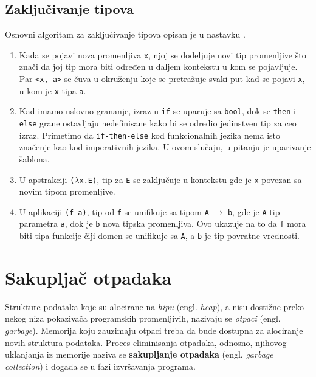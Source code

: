 \documentclass[a4paper]{article}
\begin{document}
\subsection{Zaključivanje tipova}
\label{subsec: zakljucivanje tipova}

Osnovni algoritam za zaključivanje tipova opisan je u nastavku \cite{basic-typechecking}.

\begin{enumerate}
	\item Kada se pojavi nova promenljiva \verb|x|, njoj se dodeljuje novi tip promenljive što znači da joj tip mora biti određen u daljem kontekstu u kom se pojavljuje. Par \verb|<x, a>| se čuva u okruženju koje se pretražuje svaki put kad se pojavi \verb|x|, u kom je \verb|x| tipa \verb|a|.
	
	\item Kad imamo uslovno grananje, izraz u \verb|if| se uparuje sa \verb|bool|, dok se \verb|then| i \verb|else| grane ostavljaju nedefinisane kako bi se odredio jedinstven tip za ceo izraz. Primetimo da \verb|if-then-else| kod funkcionalnih jezika nema isto značenje kao kod imperativnih jezika. U ovom slučaju, u pitanju je uparivanje šablona.
	
	\item U apstrakciji \verb|(|$\lambda$\verb|x.E)|, tip za \verb|E| se zaključuje u kontekstu gde je \verb|x| povezan sa novim tipom promenljive.
	
	\item U aplikaciji \verb|(f a)|, tip od \verb|f| se unifikuje sa tipom \verb|A| $\longrightarrow$ \verb|b|, gde je \verb|A| tip parametra \verb|a|, dok je \verb|b| nova tipska promenljiva. Ovo ukazuje na to da \verb|f| mora biti tipa funkcije čiji domen se unifikuje sa \verb|A|, a \verb|b| je tip povratne vrednosti.
\end{enumerate}



\section{Sakupljač otpadaka}
\label{sec:djubretar}


Strukture podataka koje su alocirane na \textit{hipu} (engl. \textit{heap}), a nisu dostižne preko nekog niza pokazivača programskih promenljivih, nazivaju se \textit{otpaci} (engl. \textit{garbage}). Memorija koju zauzimaju otpaci treba da bude dostupna za alociranje novih struktura podataka. Proces eliminisanja otpadaka, odnosno, njihovog uklanjanja iz memorije naziva se \textbf{sakupljanje otpadaka} (engl. \textit{garbage collection}) i događa se u fazi izvršavanja programa.
\end{document}
